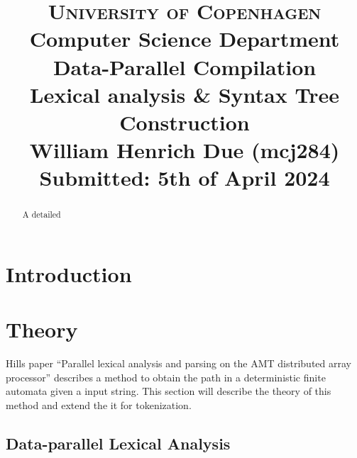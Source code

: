 \documentclass[a4paper,12pt]{article}
\title{
    {\Large \textsc{University of Copenhagen}} \\[0pt]
    {\large Computer Science Department} \\[10pt]
    {\Large Data-Parallel Compilation} \\[4pt]
    {\large Lexical analysis \& Syntax Tree Construction} \\[10pt]
    William Henrich Due (mcj284)  \\[0pt]
    Submitted: 5th of April 2024
}
\author{}
\date{}
\theoremstyle{definition}
\begin{document}
\maketitle
\thispagestyle{firstpage}
\begin{abstract}
    A detailed 
\end{abstract}

\tableofcontents

\section{Introduction}


\section{Theory}
Hills paper ``Parallel lexical analysis and parsing on the AMT
distributed array processor'' \cite{HILL1992699} describes a method to obtain the path in a deterministic finite automata given a input string. This section will describe the theory of this method and extend the it for tokenization.

\subsection{Data-parallel Lexical Analysis}
\end{document}
